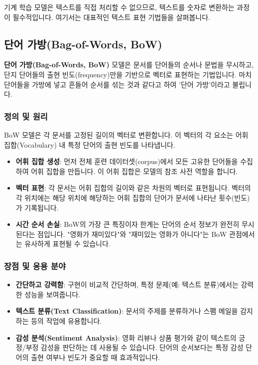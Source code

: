 \documentclass[11pt,a4paper]{article}
\theoremstyle{definition}
\begin{document}
기계 학습 모델은 텍스트를 직접 처리할 수 없으므로, 텍스트를 숫자로 변환하는 과정이 필수적입니다. 여기서는 대표적인 텍스트 표현 기법들을 살펴봅니다.

\subsection{단어 가방(Bag-of-Words, BoW)}

\begin{tcolorbox}[conceptbox, title=\textbf{핵심 개념}]
\textbf{단어 가방(Bag-of-Words, BoW)} 모델은 문서를 단어들의 순서나 문법을 무시하고, 단지 단어들의 출현 빈도(frequency)만을 기반으로 벡터로 표현하는 기법입니다. 마치 단어들을 가방에 넣고 흔들어 순서를 섞는 것과 같다고 하여 '단어 가방'이라고 불립니다.
\end{tcolorbox}

\subsubsection{정의 및 원리}
BoW 모델은 각 문서를 고정된 길이의 벡터로 변환합니다. 이 벡터의 각 요소는 어휘 집합(Vocabulary) 내 특정 단어의 출현 빈도를 나타냅니다.

\begin{itemize}
    \item \textbf{어휘 집합 생성}: 먼저 전체 훈련 데이터셋(corpus)에서 모든 고유한 단어들을 수집하여 어휘 집합을 만듭니다. 이 어휘 집합은 모델의 참조 사전 역할을 합니다.
    \item \textbf{벡터 표현}: 각 문서는 어휘 집합의 길이와 같은 차원의 벡터로 표현됩니다. 벡터의 각 위치에는 해당 위치에 해당하는 어휘 집합의 단어가 문서에 나타난 횟수(빈도)가 기록됩니다.
    \item \textbf{시간 순서 손실}: BoW의 가장 큰 특징이자 한계는 단어의 순서 정보가 완전히 무시된다는 점입니다. "영화가 재미있다"와 "재미있는 영화가 아니다"는 BoW 관점에서는 유사하게 표현될 수 있습니다.
\end{itemize}

\subsubsection{장점 및 응용 분야}
\begin{itemize}
    \item \textbf{간단하고 강력함}: 구현이 비교적 간단하며, 특정 문제(예: 텍스트 분류)에서는 강력한 성능을 보여줍니다.
    \item \textbf{텍스트 분류(Text Classification)}: 문서의 주제를 분류하거나 스팸 메일을 감지하는 등의 작업에 유용합니다.
    \item \textbf{감성 분석(Sentiment Analysis)}: 영화 리뷰나 상품 평가와 같이 텍스트의 긍정/부정 감성을 판단하는 데 사용될 수 있습니다. 단어의 순서보다는 특정 감성 단어의 출현 여부나 빈도가 중요할 때 효과적입니다.
\end{itemize}
\end{document}
